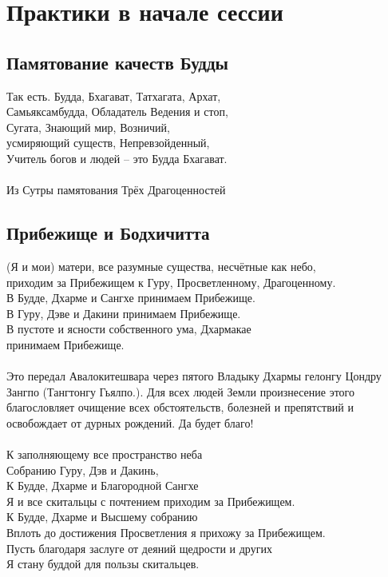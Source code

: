 \section{Практики в начале сессии}

\subsection{Памятование качеств Будды}
\small
Так есть. Будда, Бхагават, Татхагата, Архат,\\
Самьяксамбудда, Обладатель Ведения и стоп,\\
Сугата, Знающий мир, Возничий,\\
усмиряющий существ, Непревзойденный,\\
Учитель богов и людей – это Будда Бхагават.\\
\\
\scriptsize
Из Сутры памятования Трёх Драгоценностей
\small

\subsection{Прибежище и Бодхичитта}

(Я и мои) матери, все разумные существа, несчётные как небо,\\
приходим за Прибежищем к Гуру, Просветленному, Драгоценному.\\
В Будде, Дхарме и Сангхе принимаем Прибежище.\\
В Гуру, Дэве и Дакини принимаем Прибежище.\\
В пустоте и ясности собственного ума, Дхармакае \\ \indent принимаем Прибежище.\\
\\
\scriptsize
Это передал Авалокитешвара через пятого Владыку Дхармы
гелонгу Цондру Зангпо (Тангтонгу Гьялпо.).
Для всех людей Земли произнесение этого благословляет
очищение всех обстоятельств, болезней и препятствий
и освобождает от дурных рождений. Да будет благо!\\
\small
\\
К заполняющему все пространство неба\\
Собранию Гуру, Дэв и Дакинь, \\
К Будде, Дхарме и Благородной Сангхе\\
Я и все скитальцы с почтением приходим за Прибежищем.\\

К Будде, Дхарме и Высшему собранию\\
Вплоть до достижения Просветления я прихожу за Прибежищем.\\
Пусть благодаря заслуге от деяний щедрости и других\\
Я стану буддой для пользы скитальцев.\\

